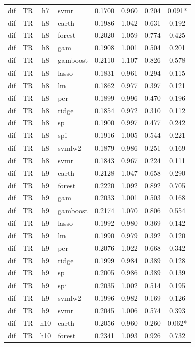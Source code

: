 \begin{ThreePartTable}
\begin{longtable}[t]{llclcccc}
dif & TR & h7 & svmr & 0.1700 & 0.960 & 0.204 & 0.091*\\
\addlinespace
dif & TR & h8 & earth & 0.1986 & 1.042 & 0.631 & 0.192\\
dif & TR & h8 & forest & 0.2020 & 1.059 & 0.774 & 0.425\\
dif & TR & h8 & gam & 0.1908 & 1.001 & 0.504 & 0.201\\
dif & TR & h8 & gamboost & 0.2110 & 1.107 & 0.826 & 0.578\\
dif & TR & h8 & lasso & 0.1831 & 0.961 & 0.294 & 0.115\\
dif & TR & h8 & lm & 0.1862 & 0.977 & 0.397 & 0.121\\
dif & TR & h8 & pcr & 0.1899 & 0.996 & 0.470 & 0.196\\
dif & TR & h8 & ridge & 0.1854 & 0.972 & 0.310 & 0.112\\
dif & TR & h8 & sp & 0.1900 & 0.997 & 0.477 & 0.242\\
dif & TR & h8 & spi & 0.1916 & 1.005 & 0.544 & 0.221\\
dif & TR & h8 & svmlw2 & 0.1879 & 0.986 & 0.251 & 0.169\\
dif & TR & h8 & svmr & 0.1843 & 0.967 & 0.224 & 0.111\\
\addlinespace
dif & TR & h9 & earth & 0.2128 & 1.047 & 0.658 & 0.290\\
dif & TR & h9 & forest & 0.2220 & 1.092 & 0.892 & 0.705\\
dif & TR & h9 & gam & 0.2033 & 1.001 & 0.503 & 0.168\\
dif & TR & h9 & gamboost & 0.2174 & 1.070 & 0.806 & 0.554\\
dif & TR & h9 & lasso & 0.1992 & 0.980 & 0.369 & 0.142\\
dif & TR & h9 & lm & 0.1990 & 0.979 & 0.392 & 0.120\\
dif & TR & h9 & pcr & 0.2076 & 1.022 & 0.668 & 0.342\\
dif & TR & h9 & ridge & 0.1999 & 0.984 & 0.389 & 0.128\\
dif & TR & h9 & sp & 0.2005 & 0.986 & 0.389 & 0.139\\
dif & TR & h9 & spi & 0.2035 & 1.002 & 0.514 & 0.195\\
dif & TR & h9 & svmlw2 & 0.1996 & 0.982 & 0.169 & 0.126\\
dif & TR & h9 & svmr & 0.2045 & 1.006 & 0.574 & 0.393\\
\addlinespace
dif & TR & h10 & earth & 0.2056 & 0.960 & 0.260 & 0.062*\\
dif & TR & h10 & forest & 0.2341 & 1.093 & 0.926 & 0.732\\

\end{longtable}
\end{ThreePartTable}
